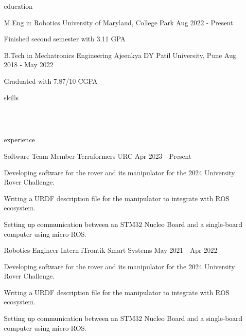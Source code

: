 \documentclass[12pt, a4paper]{eon-resume}
\begin{document}
\begin{section}{education}

  \begin{school}
    {M.Eng in Robotics}
    {University of Maryland, College Park}
    {Aug 2022 - Present}
    
    \item Finished second semester with 3.11 GPA
    
  \end{school}

  \begin{school}
    {B.Tech in Mechatronics Engineering}
    {Ajeenkya DY Patil University, Pune}
    {Aug 2018 - May 2022}

    \item Graduated with 7.87/10 CGPA

  \end{school}

\end{section}

\begin{section}{skills}

   \\
   \\
  
\end{section}

\begin{section}{experience}

  \begin{work}
    {Software Team Member}
    {Terraformers URC}
    {Apr 2023 - Present}

    \item Developing software for the rover and its manipulator for the 2024 University Rover Challenge.
    \item Writing a URDF description file for the manipulator to integrate with ROS ecosystem.
    \item Setting up communication between an STM32 Nucleo Board and a single-board computer using micro-ROS.
  
  \end{work}

  \begin{work}
    {Robotics Engineer Intern}
    {iTrontik Smart Systems}
    {May 2021 - Apr 2022}

    \item Developing software for the rover and its manipulator for the 2024 University Rover Challenge.
    \item Writing a URDF description file for the manipulator to integrate with ROS ecosystem.
    \item Setting up communication between an STM32 Nucleo Board and a single-board computer using micro-ROS.
  
  \end{work}

\end{section}
\end{document}
